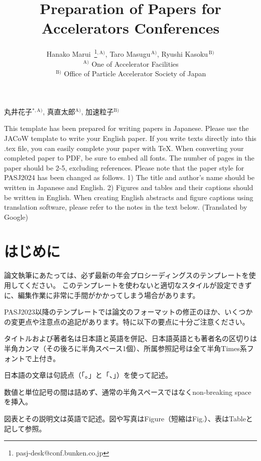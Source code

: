 \documentclass{PASJ2024}
\newcommand{\jaffi}[1]{$^{\mathrm{#1)}}$}
\newcommand{\affi}[1]{$^{\,\mathrm{#1)}}$}
\newcommand{\affithanks}[2]{\,\thanks{#1}\!$^{,\mathrm{#2)}}$}
\begin{document}
%
%
\title{Preparation of Papers for Accelerators Conferences}
%
\jauthor
{
丸井花子\jaffi{*, A},
真直太郎\jaffi{A},
加速粒子\jaffi{B}
}
%
\author
{
Hanako Marui \affithanks{pasj-desk@conf.bunken.co.jp}{A},
Taro Masugu\affi{A},
Ryushi Kasoku\affi{B}\\
\affi{A} One of Accelerator Facilities\\
\affi{B} Office of Particle Accelerator Society of Japan\\
}
%
\Abstract
{
This template has been prepared for writing papers in Japanese. Please use the JACoW template to write your English paper. If you write texts directly into this .tex file, you can easily complete your paper with \TeX. When converting your completed paper to PDF, be sure to embed all fonts. The number of pages in the paper should be 2-5, excluding references. Please note that the paper style for PASJ2024 has been changed as follows. 1) The title and author's name should be written in Japanese and English. 2) Figures and tables and their captions should be written in English. When creating English abstracts and figure captions using translation software, please refer to the notes in the text below. (Translated by Google)
}
%
\maketitle
%
\section{はじめに}
論文執筆にあたっては、必ず最新の年会プロシーディングスのテンプレートを使用してください。%
このテンプレートを使わないと適切なスタイルが設定できずに、編集作業に非常に手間がかかってしまう場合があります。

PASJ2023以降のテンプレートでは論文のフォーマットの修正のほか、いくつかの変更点や注意点の追記があります。特に以下の要点に十分ご注意ください。
%
\begin{Itemize}
\item{タイトルおよび著者名は日本語と英語を併記、日本語英語とも著者名の区切りは半角カンマ（その後ろに半角スペース1個）、所属参照記号は全て半角Times系フォントで上付き。} 
%
\item{日本語の文章は句読点（「。」と「、」）を使って記述。}
%
\item{数値と単位記号の間は詰めず、通常の半角スペースではなくnon-breaking spaceを挿入。}
%
\item{図表とその説明文は英語で記述。図や写真はFigure（短縮はFig.）、表はTableと記して参照。}
%
\end{Itemize}
\end{document}
